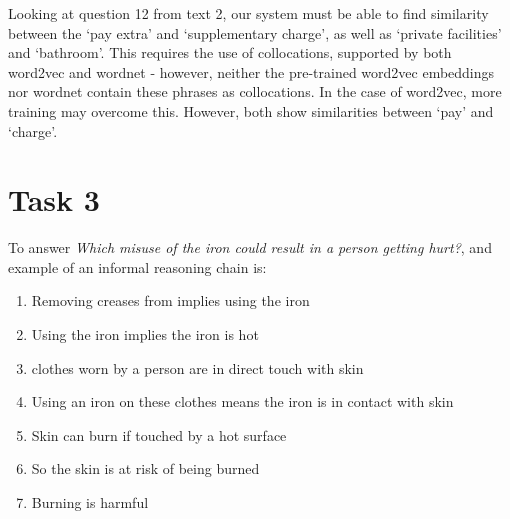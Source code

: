 \documentclass[12pt,a4paper]{article}
\begin{document}
Looking at question 12 from text 2, our system must be able to find similarity between the `pay extra' and `supplementary charge', as well as `private facilities' and `bathroom'. This requires the use of collocations, supported by both word2vec and wordnet - however, neither the pre-trained word2vec embeddings nor wordnet contain these phrases as collocations. In the case of word2vec, more training may overcome this. However, both show similarities between `pay' and `charge'.


\section*{Task 3}

To answer \textit{Which misuse of the iron could result in a person getting hurt?}, and example of an informal reasoning chain is:

\begin{enumerate}
    \item Removing creases from implies using the iron
    \item Using the iron implies the iron is hot
    \item clothes worn by a person are in direct touch with skin
    \item Using an iron on these clothes means the iron is in contact with skin
    \item Skin can burn if touched by a hot surface
    \item So the skin is at risk of being burned
    \item Burning is harmful
\end{enumerate}


\end{document}

